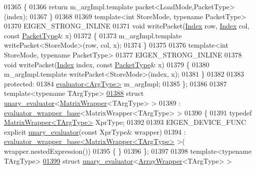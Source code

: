 \begin{DoxyCode}
01365 \textcolor{keyword}{  }\{
01366     \textcolor{keywordflow}{return} m\_argImpl.template packet<LoadMode,PacketType>(index);
01367   \}
01368 
01369   \textcolor{keyword}{template}<\textcolor{keywordtype}{int} StoreMode, \textcolor{keyword}{typename} PacketType>
01370   EIGEN\_STRONG\_INLINE
01371   \textcolor{keywordtype}{void} writePacket(\hyperlink{namespace_eigen_a62e77e0933482dafde8fe197d9a2cfde}{Index} row, \hyperlink{namespace_eigen_a62e77e0933482dafde8fe197d9a2cfde}{Index} col, \textcolor{keyword}{const} \hyperlink{struct_eigen_1_1_packet_type}{PacketType}& x)
01372   \{
01373     m\_argImpl.template writePacket<StoreMode>(row, col, x);
01374   \}
01375 
01376   \textcolor{keyword}{template}<\textcolor{keywordtype}{int} StoreMode, \textcolor{keyword}{typename} PacketType>
01377   EIGEN\_STRONG\_INLINE
01378   \textcolor{keywordtype}{void} writePacket(\hyperlink{namespace_eigen_a62e77e0933482dafde8fe197d9a2cfde}{Index} index, \textcolor{keyword}{const} \hyperlink{struct_eigen_1_1_packet_type}{PacketType}& x)
01379   \{
01380     m\_argImpl.template writePacket<StoreMode>(index, x);
01381   \}
01382 
01383 \textcolor{keyword}{protected}:
01384   \hyperlink{struct_eigen_1_1internal_1_1evaluator}{evaluator<ArgType>} m\_argImpl;
01385 \};
01386 
01387 \textcolor{keyword}{template}<\textcolor{keyword}{typename} TArgType>
\hyperlink{struct_eigen_1_1internal_1_1unary__evaluator_3_01_matrix_wrapper_3_01_t_arg_type_01_4_01_4}{01388} \textcolor{keyword}{struct }\hyperlink{struct_eigen_1_1internal_1_1unary__evaluator}{unary\_evaluator}<\hyperlink{group___core___module_class_eigen_1_1_matrix_wrapper}{MatrixWrapper}<TArgType> >
01389   : \hyperlink{struct_eigen_1_1internal_1_1evaluator__wrapper__base}{evaluator\_wrapper\_base}<MatrixWrapper<TArgType> >
01390 \{
01391   \textcolor{keyword}{typedef} \hyperlink{group___core___module_class_eigen_1_1_matrix_wrapper}{MatrixWrapper<TArgType>} XprType;
01392 
01393   EIGEN\_DEVICE\_FUNC \textcolor{keyword}{explicit} \hyperlink{struct_eigen_1_1internal_1_1unary__evaluator}{unary\_evaluator}(\textcolor{keyword}{const} XprType& wrapper)
01394     : \hyperlink{struct_eigen_1_1internal_1_1evaluator__wrapper__base}{evaluator\_wrapper\_base<MatrixWrapper<TArgType>} >(
      wrapper.nestedExpression())
01395   \{ \}
01396 \};
01397 
01398 \textcolor{keyword}{template}<\textcolor{keyword}{typename} TArgType>
\hyperlink{struct_eigen_1_1internal_1_1unary__evaluator_3_01_array_wrapper_3_01_t_arg_type_01_4_01_4}{01399} \textcolor{keyword}{struct }\hyperlink{struct_eigen_1_1internal_1_1unary__evaluator}{unary\_evaluator}<\hyperlink{group___core___module_class_eigen_1_1_array_wrapper}{ArrayWrapper}<TArgType> >

\end{DoxyCode}
